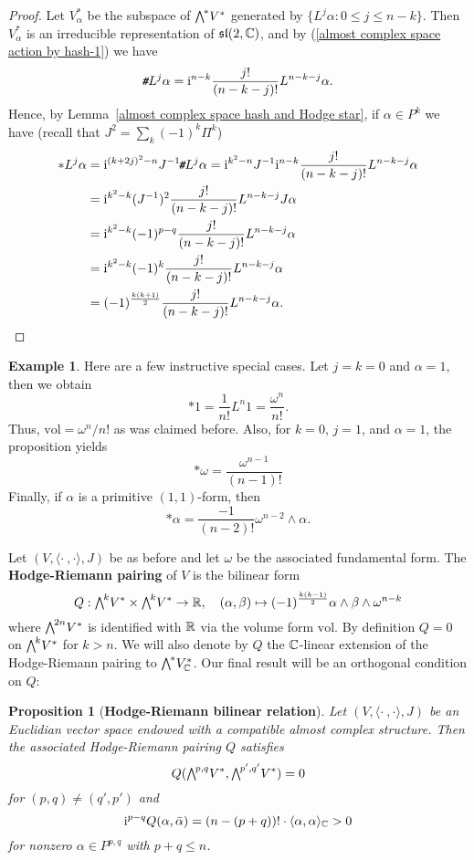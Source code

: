 \documentclass[11pt]{book}
\newtheorem{proposition}[theorem]{Proposition}
\theoremstyle{definition}
\newtheorem{example}[theorem]{Example}
\begin{document}
\begin{proof}
Let $V^*_\alpha$ be the subspace of $\bigw^*V^*$ generated by $\{L^j\alpha:0\leq j\leq n-k\}$. Then $V^*_\alpha$ is an irreducible representation of $\mathfrak{sl}(2,\mathbb{C})$, and by (\ref{almost complex space action by hash-1}) we have
\[\!\textit{\texttt{\#}} L^j\alpha=\mathrm{i}^{n-k}\frac{j!}{(n-k-j)!}L^{n-k-j}\alpha.\]
Hence, by Lemma~\ref{almost complex space hash and Hodge star}, if $\alpha\in P^k$ we have (recall that $J^2=\sum_k(-1)^k\Pi^k$)
\begin{align*}
\ast L^j\alpha&=\mathrm{i}^{(k+2j)^2-n}J^{-1}\!\textit{\texttt{\#}} L^j\alpha=\mathrm{i}^{k^2-n}J^{-1}\mathrm{i}^{n-k}\frac{j!}{(n-k-j)!}L^{n-k-j}\alpha\\
&=\mathrm{i}^{k^2-k}(J^{-1})^2\frac{j!}{(n-k-j)!}L^{n-k-j}J\alpha\\
&=\mathrm{i}^{k^2-k}(-1)^{p-q}\frac{j!}{(n-k-j)!}L^{n-k-j}\alpha\\
&=\mathrm{i}^{k^2-k}(-1)^{k}\frac{j!}{(n-k-j)!}L^{n-k-j}\alpha\\
&=(-1)^{\frac{k(k+1)}{2}}\frac{j!}{(n-k-j)!}L^{n-k-j}\alpha.\qedhere
\end{align*}
\end{proof}
\begin{example}
Here are a few instructive special cases. Let $j=k=0$ and $\alpha=1$, then we obtain 
\[\ast 1=\frac{1}{n!}L^n1=\frac{\omega^n}{n!}.\]
Thus, $\mathrm{vol}=\omega^n/n!$ as was claimed before. Also, for $k=0$, $j=1$, and $\alpha=1$, the proposition yields 
\[\ast\omega=\frac{\omega^{n-1}}{(n-1)!}\]
Finally, if $\alpha$ is a primitive $(1,1)$-form, then
\[\ast\alpha=\frac{-1}{(n-2)!}\omega^{n-2}\wedge\alpha.\]
\end{example}
Let $(V,\langle\cdot\ ,\cdot\rangle,J)$ be as before and let $\omega$ be the associated fundamental form. The \textbf{Hodge-Riemann pairing} of $V$ is the bilinear form
\[Q:\bigw^kV^*\times\bigw^kV^*\to\R,\quad (\alpha,\beta)\mapsto(-1)^{\frac{k(k-1)}{2}}\alpha\wedge\beta\wedge\omega^{n-k}\]
where $\bigw^{2n}V^*$ is identified with $\mathbb{R}$ via the volume form $\mathrm{vol}$. By definition $Q=0$ on $\bigw^kV^*$ for $k>n$. We will also denote by $Q$ the $\mathbb{C}$-linear extension of the Hodge-Riemann pairing to $\bigw^*V^*_{\C}$. Our final result will be an orthogonal condition on $Q$:
\begin{proposition}[\textbf{Hodge-Riemann bilinear relation}]\label{almost complex space Hodge-Riemann bilinera relation}
Let $(V,\langle\cdot\ ,\cdot\rangle,J)$ be an Euclidian vector space endowed with a compatible almost complex structure. Then the associated Hodge-Riemann pairing $Q$ satisfies
\[Q(\bigw^{p,q}V^*,\bigw^{p',q'}V^*)=0\]
for $(p,q)\neq(q',p')$ and
\[\mathrm{i}^{p-q}Q(\alpha,\bar{\alpha})=(n-(p+q))!\cdot\langle\alpha,\alpha\rangle_{\mathbb{C}}>0\]
for nonzero $\alpha\in P^{p,q}$ with $p+q\leq n$.
\end{proposition}
\end{document}
